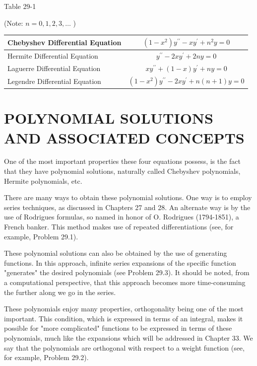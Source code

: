 \documentclass[10pt]{article}
\begin{document}
Table 29-1

(Note: $n=0,1,2,3, \ldots$ )

\begin{center}
\begin{tabular}{|l|c|}
\hline
Chebyshev Differential Equation & $\left(1-x^{2}\right) y^{\prime \prime}-x y^{\prime}+n^{2} y=0$ \\
\hline
Hermite Differential Equation & $y^{\prime \prime}-2 x y^{\prime}+2 n y=0$ \\
\hline
Laguerre Differential Equation & $x y^{\prime \prime}+(1-x) y^{\prime}+n y=0$ \\
\hline
Legendre Differential Equation & $\left(1-x^{2}\right) y^{\prime \prime}-2 x y^{\prime}+n(n+1) y=0$ \\
\hline
\end{tabular}
\end{center}

\section*{POLYNOMIAL SOLUTIONS AND ASSOCIATED CONCEPTS}
One of the most important properties these four equations possess, is the fact that they have polynomial solutions, naturally called Chebyshev polynomials, Hermite polynomials, etc.

There are many ways to obtain these polynomial solutions. One way is to employ series techniques, as discussed in Chapters 27 and 28. An alternate way is by the use of Rodrigues formulas, so named in honor of O. Rodrigues (1794-1851), a French banker. This method makes use of repeated differentiations (see, for example, Problem 29.1).

These polynomial solutions can also be obtained by the use of generating functions. In this approach, infinite series expansions of the specific function "generates" the desired polynomials (see Problem 29.3). It should be noted, from a computational perspective, that this approach becomes more time-consuming the further along we go in the series.

These polynomials enjoy many properties, orthogonality being one of the most important. This condition, which is expressed in terms of an integral, makes it possible for "more complicated" functions to be expressed in terms of these polynomials, much like the expansions which will be addressed in Chapter 33. We say that the polynomials are orthogonal with respect to a weight function (see, for example, Problem 29.2).
\end{document}
